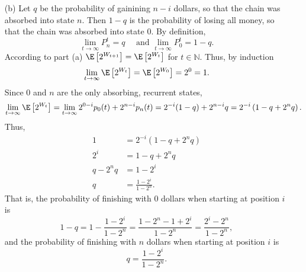 \begin{enumerate}
  \item[(b)] Let $q$ be the probability of gainining $n-i$ dollars, so that the
  chain was absorbed into state $n$. Then $1-q$ is the probability of losing all
  money, so that the chain was absorbed into state 0. By definition,
  \[
   \lim_{t \to \infty} P_n^t = q \quad \text{ and } \lim_{t \to \infty} P_0^t = 1-q.
  \]
  According to part (a) $\E\left[2^{W_{t+1}}\right] = \E\left[2^{W_t}\right]$ for
  $t \in \mathbb{N}$. Thus, by induction
  \begin{align*}
    \lim_{t \to \infty} \E\left[2^{W_t}\right] = \E\left[2^{W_0}\right] = 2^0 = 1.
  \end{align*}
  Since 0 and $n$ are the only absorbing, recurrent states,
  \begin{align*}
    \lim_{t \to \infty} \E\left[2^{W_t}\right]
      = \lim_{t \to \infty} 2^{0-i} p_0(t) + 2^{n-i} p_n(t)
      = 2^{-i}(1-q) + 2^{n-i}q
      = 2^{-i}\left(1 - q + 2^n q\right).
  \end{align*}
  Thus,
  \begin{align*}
    1           &= 2^{-i}\left(1 - q + 2^n q\right) \\
    2^i         &= 1 - q + 2^n q \\
    q - 2^n q   &= 1 - 2^i \\
    q           &= \frac{1-2^i}{1-2^n}.
  \end{align*}
  That is, the probability of finishing with 0 dollars when starting at position
  $i$ is
  \[ 1 - q
    = 1 - \frac{1-2^i}{1-2^n}
    = \frac{1 - 2^n - 1 + 2^i}{1 - 2^n}
    =  \frac{2^i - 2^n}{1 - 2^n},
  \]
  and the probability of finishing with $n$ dollars when starting at position
  $i$ is
  \[ q = \frac{1-2^i}{1-2^n}. \]


\end{enumerate}

